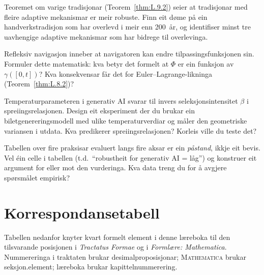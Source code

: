 \begin{exercise}[Nivå 2]\label{ex:9.4}
Teoremet om varige tradisjonar (Teorem~\ref{thm:L.9.2}) seier at
tradisjonar med fleire adaptive mekanismar er meir robuste. Finn
eit døme på ein handverkstradisjon som har overlevd i meir enn
200~år, og identifiser minst tre uavhengige adaptive mekanismar
som har bidrege til overlevinga.
\end{exercise}

\begin{exercise}[Nivå 3]\label{ex:9.5}
Refleksiv navigasjon inneber at navigatoren kan endre
tilpassingsfunksjonen sin. Formuler dette matematisk: kva betyr det
formelt at $\Phi$ er ein funksjon av $\gamma([0, t])$? Kva
konsekvensar får det for Euler--Lagrange-likninga
(Teorem~\ref{thm:L.8.2})?
\end{exercise}

\begin{exercise}[Nivå 3]\label{ex:9.6}
Temperaturparameteren i generativ AI svarar til invers
seleksjonsintensitet $\beta$ i spreiingsrelasjonen. Design eit
eksperiment der du brukar ein biletgenereringsmodell med ulike
temperaturverdiar og måler den geometriske variansen i utdata.
Kva predikerer spreiingsrelasjonen? Korleis ville du teste det?
\end{exercise}

\begin{exercise}[Nivå 3]\label{ex:9.7}
Tabellen over fire praksisar evaluert langs fire aksar er ein
\emph{påstand}, ikkje eit bevis. Vel éin celle i tabellen (t.d.\
``robustheit for generativ AI = låg'') og konstruer eit argument
for eller mot den vurderinga. Kva data treng du for å avgjere
spørsmålet empirisk?
\end{exercise}


\appendix

\chapter{Korrespondansetabell}
\label{app:korrespondanse}

Tabellen nedanfor knyter kvart formelt element i denne læreboka
til den tilsvarande posisjonen i \emph{Tractatus Formae} og i
\emph{Formlære: Mathematica}. Nummereringa i traktaten brukar
desimalproposisjonar; \textsc{Mathematica} brukar
seksjon.element; læreboka brukar kapittelnummerering.

